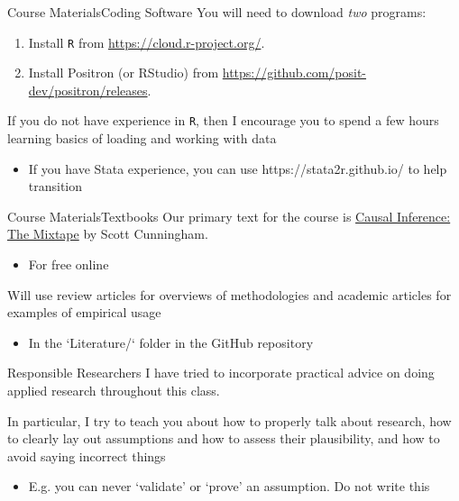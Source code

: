 \documentclass[aspectratio=169,t,11pt,table]{beamer}
\begin{document}
\begin{frame}{Course Materials}{Coding Software}
  You will need to download \emph{two} programs:
  \begin{enumerate}
    \item Install \texttt{R} from \url{https://cloud.r-project.org/}.
    \item Install Positron (or RStudio) from \url{https://github.com/posit-dev/positron/releases}. 
  \end{enumerate}

  \bigskip
  If you do not have experience in \texttt{R}, then I encourage you to spend a few hours learning basics of loading and working with data
  \begin{itemize}
    \item If you have Stata experience, you can use https://stata2r.github.io/ to help transition
  \end{itemize}
\end{frame}

\begin{frame}{Course Materials}{Textbooks}
  Our primary text for the course is \href{https://mixtape.scunning.com/}{Causal Inference: The Mixtape} by Scott Cunningham. 
  \begin{itemize}
    \item For free online
  \end{itemize}
  
  \bigskip
  Will use review articles for overviews of methodologies and academic articles for examples of empirical usage
  \begin{itemize}
    \item In the `Literature/` folder in the GitHub repository
  \end{itemize} 
\end{frame}

\begin{frame}{Responsible Researchers}
  I have tried to incorporate practical advice on doing applied research throughout this class. 
  
  \bigskip
  In particular, I try to teach you about how to properly talk about research,  how to clearly lay out assumptions and how to assess their plausibility, and how to avoid saying incorrect things
  \begin{itemize}
    \item E.g. you can never `validate' or `prove' an assumption. Do not write this
  \end{itemize}
\end{frame}
\end{document}
